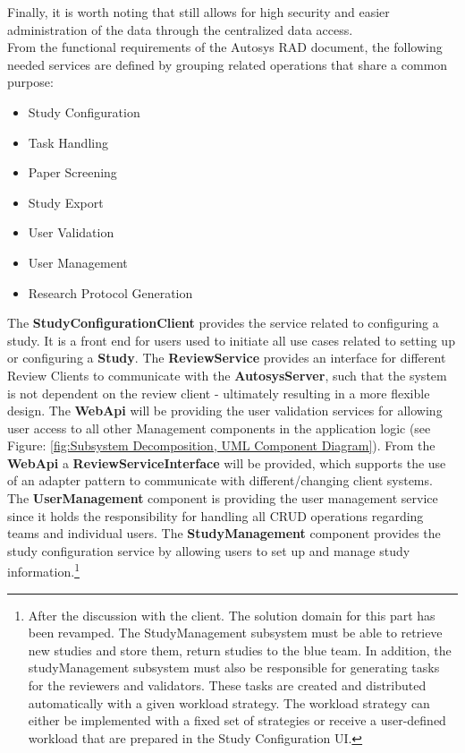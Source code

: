 Finally, it is worth noting that still allows for high security and easier administration of the data through the centralized data access.\\
From the functional requirements of the Autosys RAD document, the following needed services are defined by grouping related operations that share a common purpose:\\
\begin{itemize}
	\item Study Configuration
	\item Task Handling
	\item Paper Screening
	\item Study Export
	\item User Validation
	\item User Management
	\item Research Protocol Generation
\end{itemize}
The \textbf{StudyConfigurationClient} provides the service related to configuring a study. It is a front end for users used to initiate all use cases related to setting up or configuring a \textbf{Study}.
The \textbf{ReviewService} provides an interface for different Review Clients to communicate with the \textbf{AutosysServer}, such that the system is not dependent on the review client - ultimately resulting in a more flexible design.
The \textbf{WebApi} will be providing the user validation services for allowing user access to all other Management components in the application logic (see Figure: \ref{fig:Subsystem Decomposition, UML Component Diagram}).
From the \textbf{WebApi} a \textbf{ReviewServiceInterface} will be provided, which supports the use of an adapter pattern to communicate with different/changing client systems.
The \textbf{UserManagement} component is providing the user management service since it holds the responsibility for handling all CRUD operations regarding teams and individual users. The \textbf{StudyManagement} component  provides the study configuration service by allowing users to set up and manage study information.\footnote{After the discussion with the client. The solution domain for this part has been revamped. The StudyManagement subsystem must be able to retrieve new studies and store them, return studies to the blue team. In addition, the  studyManagement subsystem must also be responsible for generating tasks for the reviewers and validators. These tasks are created and distributed automatically with a given workload strategy.  The workload strategy can either be implemented with a fixed set of strategies or receive a user-defined workload  that are prepared in the Study Configuration UI.}
